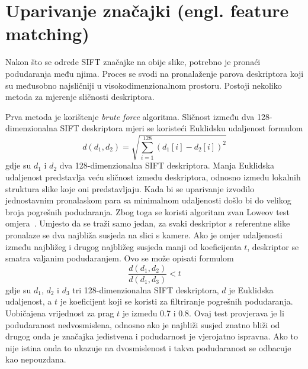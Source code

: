 \section{Uparivanje značajki (engl. feature matching)}

Nakon što se odrede SIFT značajke na obije slike, potrebno je pronaći podudaranja među njima. Proces se svodi na pronalaženje parova deskriptora koji su međusobno najsličniji u visokodimenzionalnom prostoru. Postoji nekoliko metoda za mjerenje sličnosti deskriptora.

Prva metoda je korištenje \textit{brute force} algoritma. Sličnost između dva 128-dimenzionalna SIFT deskriptora mjeri se koristeći Euklidsku udaljenost formulom
\begin{equation}
    d(d_1, d_2) = \sqrt{\sum_{i=1}^{128} (d_1[i] - d_2[i])^2}
\end{equation}
gdje su $d_1$ i $d_2$ dva 128-dimenzionalna SIFT deskriptora. Manja Euklidska udaljenost predstavlja veću sličnost između deskriptora, odnosno između lokalnih struktura slike koje oni predstavljaju.
Kada bi se uparivanje izvodilo jednostavnim pronalaskom para sa minimalnom udaljenosti došlo bi do velikog broja pogrešnih podudaranja. Zbog toga se koristi algoritam zvan Loweov test omjera~\cite{lowe2004sift}. Umjesto da se traži samo jedan, za svaki deskriptor s referentne slike pronalaze se dva najbliža susjeda na slici s kamere. Ako je omjer udaljenosti između najbližeg i drugog najbližeg susjeda manji od koeficijenta $t$, deskriptor se smatra valjanim podudaranjem. Ovo se može opisati formulom
\begin{equation}
    \frac{d(d_1, d_2)}{d(d_1, d_3)} < t
\end{equation}
gdje su $d_1$, $d_2$ i $d_3$ tri 128-dimenzionalna SIFT deskriptora, $d$ je Euklidska udaljenost, a $t$ je koeficijent koji se koristi za filtriranje pogrešnih podudaranja. Uobičajena vrijednost za prag $t$ je između 0.7 i 0.8. Ovaj test provjerava je li podudaranost nedvosmislena, odnosno ako je najbliži susjed znatno bliži od drugog onda je značajka jedistvena i podudarnost je vjerojatno ispravna. Ako to nije istina onda to ukazuje na dvosmislenost i takva podudaranost se odbacuje kao nepouzdana.

